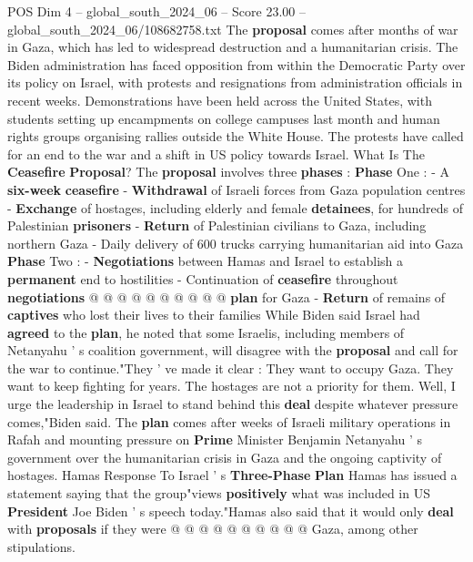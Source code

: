 \begin{textsample}{POS Dim 4 – global\_south\_2024\_06 – Score 23.00 – global\_south\_2024\_06/108682758.txt}  \label{ex:f4_pos_089}
The \textbf{proposal} comes after months of war in Gaza, which has led to widespread destruction and a humanitarian crisis.
The Biden administration has faced opposition from within the Democratic Party over its policy on Israel, with protests and resignations from administration officials in recent weeks.
Demonstrations have been held across the United States, with students setting up encampments on college campuses last month and human rights groups organising rallies outside the White House.
The protests have called for an end to the war and a shift in US policy towards Israel.
What Is The \textbf{Ceasefire} \textbf{Proposal}?
The \textbf{proposal} involves three \textbf{phases} : \textbf{Phase} One : - A \textbf{six-week} \textbf{ceasefire} - \textbf{Withdrawal} of Israeli forces from Gaza population centres - \textbf{Exchange} of hostages, including elderly and female \textbf{detainees}, for hundreds of Palestinian \textbf{prisoners} - \textbf{Return} of Palestinian civilians to Gaza, including northern Gaza - Daily delivery of 600 trucks carrying humanitarian aid into Gaza \textbf{Phase} Two : - \textbf{Negotiations} between Hamas and Israel to establish a \textbf{permanent} end to hostilities - Continuation of \textbf{ceasefire} throughout \textbf{negotiations} @ @ @ @ @ @ @ @ @ @ \textbf{plan} for Gaza - \textbf{Return} of remains of \textbf{captives} who lost their lives to their families While Biden said Israel had \textbf{agreed} to the \textbf{plan}, he noted that some Israelis, including members of Netanyahu ' s coalition government, will disagree with the \textbf{proposal} and call for the war to continue."They ' ve made it clear : They want to occupy Gaza.
They want to keep fighting for years.
The hostages are not a priority for them.
Well, I urge the leadership in Israel to stand behind this \textbf{deal} despite whatever pressure comes,"Biden said.
The \textbf{plan} comes after weeks of Israeli military operations in Rafah and mounting pressure on \textbf{Prime} Minister Benjamin Netanyahu ' s government over the humanitarian crisis in Gaza and the ongoing captivity of hostages.
Hamas Response To Israel ' s \textbf{Three-Phase} \textbf{Plan} Hamas has issued a statement saying that the group"views \textbf{positively} what was included in US \textbf{President} Joe Biden ' s speech today."Hamas also said that it would only \textbf{deal} with \textbf{proposals} if they were @ @ @ @ @ @ @ @ @ @ Gaza, among other stipulations.

\end{textsample}
